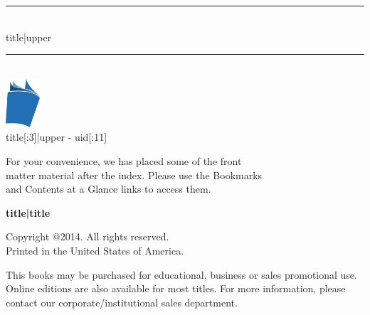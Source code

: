 \documentclass{article}
\newcommand{\HRule}{\rule{\linewidth}{1mm}}
\begin{document}
\begin{titlepage}

\pagecolor{titlepagecolor}
\color{white}

\begin{flushright}
\textcolor{white}{ }

\vspace{7cm}

\HRule \\[0.4cm]
{\large {{ title|upper }} }\\[0.4cm]
\HRule \\[2.5cm]

\includegraphics[height=18mm]{book-icon.png} \\[2mm]
\scriptsize{ {{ title[:3]|upper }}-{{ uid[:11] }} }

\end{flushright}

\vfill

\begin{flushright}
\footnotesize{ For your convenience, we has placed some of the front \\
matter material after the index. Please use the Bookmarks \\
and Contents at a Glance links to access them. }
\end{flushright}

\end{titlepage}

\nopagecolor %

\noindent
{\textbf {\footnotesize {{ title|title }} }}

\vspace{6pt}

\noindent
\scriptsize{Copyright @2014. All rights reserved. \\Printed in the United
  States of America.}

\noindent
\scriptsize{This books may be purchased for educational, business or
  sales promotional use. Online editions are also available for most
  titles. For more information, please contact our
  corporate/institutional sales department.}
\end{document}
